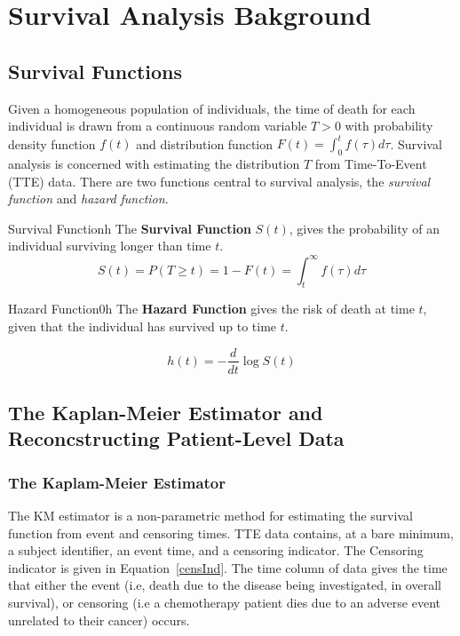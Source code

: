 \chapter{Survival Analysis Bakground}\label{survchap}

\section{Survival Functions}

Given a homogeneous population of individuals, the time of death for each individual is drawn from a continuous random variable $T > 0$ with probability density function $f(t)$ and distribution function $F(t) = \int_{0}^{t}f(\tau)d\tau$. Survival analysis is concerned with estimating the distribution $T$ from Time-To-Event (TTE) data. There are two functions central to survival analysis, the \textit{survival function} and \textit{hazard function}.

\begin{definition}{Survival Function}{h}
    The \textbf{Survival Function} $S(t)$, gives the probability of an individual surviving longer than time $t$. 
    \begin{equation}
        S(t) = P(T \geq  t) = 1 - F(t) = \int_{t}^{\infty}f(\tau)d\tau  
    \end{equation}
\end{definition}

\begin{definition}{Hazard Function0}{h}
    The \textbf{Hazard Function} gives the risk of death at time $t$, given that the individual has survived up to time $t$. 
    
    \begin{equation}
        h(t) = -\frac{d}{dt}\log S(t)  
    \end{equation}
\end{definition}

\section{The Kaplan-Meier Estimator and Reconcstructing Patient-Level Data}
\subsection{The Kaplam-Meier Estimator}
The KM estimator is a non-parametric method for estimating the survival function from event and censoring times. TTE data contains, at a bare minimum, a subject identifier, an event time, and a censoring indicator. The Censoring indicator is given in Equation~\ref{censInd}. The time column of data gives the time that either the event (i.e, death due to the disease being investigated, in overall survival), or censoring (i.e a chemotherapy patient dies due to an adverse event unrelated to their cancer) occurs.

